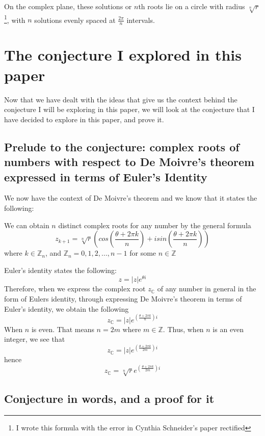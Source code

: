 \documentclass{turabian-researchpaper}
\begin{document}
On the complex plane, these solutions or \(n\)th roots lie on a circle with radius \(\sqrt[n]{r}\)\footnote{I wrote this formula with the error in Cynthia Schneider's paper rectified}, with \(n\) solutions evenly spaced at \(\frac{2\pi}{n}\) intervals.  

\section{The conjecture I explored in this paper} 

Now that we have dealt with the ideas that give us the context behind the conjecture I will be exploring in this paper, we will look at the conjecture that I have decided to explore in this paper, and prove it. 
\vspace{.1cm} 

\subsection{Prelude to the conjecture: complex roots of numbers with respect to De Moivre's theorem expressed in terms of Euler's Identity}\hypertarget{Prelude}{} 

We now have the context of De Moivre's theorem and we know that it states the following: 
\vspace{.1cm}

We can obtain \(n\) distinct complex roots for any number by the general formula $$z_{k+1} = \sqrt[n]{r}\left(cos\left(\frac{\theta + {2\pi}k}{n}\right) + isin\left(\frac{\theta + {2\pi}k}{n}\right)\right)$$  where \(k \in \mathds{Z}_n\), and \(\mathds{Z}_n = {0,1,2,...,n-1}\) for some \(n \in \mathds{Z}\) 

Euler's identity states the following: \[z = |z|e^{\theta{i}}\] Therefore, when we express the complex root \(z_{\mathds{C}}\) of any number in general in the form of Eulers identity, through expressing De Moivre's theorem in terms of Euler's identity, we obtain the following  \[z_{\mathds{C}} = |z|e^{{\left(\frac{\theta + {2\pi}k}{n}\right)}{i}}\] When \(n\) is even. That means \(n = 2m\) where \(m \in \mathds{Z}\). Thus, when \(n\) is an even integer, we see that \[z_{\mathds{C}} = |z|e^{{\left(\frac{\theta + {2\pi}k}{2m}\right)}{i}}\] hence \[z_{\mathds{C}} = {\sqrt[n]{r}}e^{{\left(\frac{\theta + {2\pi}k}{2m}\right)}{i}}\] 

\subsection{Conjecture in words, and a proof for it}
\end{document}
